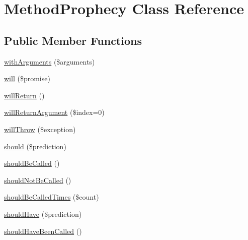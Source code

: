 \hypertarget{class_prophecy_1_1_prophecy_1_1_method_prophecy}{}\section{Method\+Prophecy Class Reference}
\label{class_prophecy_1_1_prophecy_1_1_method_prophecy}
\subsection*{Public Member Functions}
\begin{DoxyCompactItemize}
\item 
\mbox{\hyperlink{class_prophecy_1_1_prophecy_1_1_method_prophecy_a0e90c170a527e9527e3eb210d64e6bb3}{with\+Arguments}} (\$arguments)
\item 
\mbox{\hyperlink{class_prophecy_1_1_prophecy_1_1_method_prophecy_aa1cf9bd2272a7299be75a3b3741f07e1}{will}} (\$promise)
\item 
\mbox{\hyperlink{class_prophecy_1_1_prophecy_1_1_method_prophecy_aeacc5dc85f8c17f567e6f07baa1408ab}{will\+Return}} ()
\item 
\mbox{\hyperlink{class_prophecy_1_1_prophecy_1_1_method_prophecy_a0fbda70ce0045ba54f32db94bd7404f3}{will\+Return\+Argument}} (\$index=0)
\item 
\mbox{\hyperlink{class_prophecy_1_1_prophecy_1_1_method_prophecy_af54a02bf8e64c69934bdd3dbf188be32}{will\+Throw}} (\$exception)
\item 
\mbox{\hyperlink{class_prophecy_1_1_prophecy_1_1_method_prophecy_a61dec0f5a554b0c752d21194d7c677b9}{should}} (\$prediction)
\item 
\mbox{\hyperlink{class_prophecy_1_1_prophecy_1_1_method_prophecy_a89dcb101b383e29c2d527ac0f703b518}{should\+Be\+Called}} ()
\item 
\mbox{\hyperlink{class_prophecy_1_1_prophecy_1_1_method_prophecy_a3a7419a4f1949ab5dc20cd341420a529}{should\+Not\+Be\+Called}} ()
\item 
\mbox{\hyperlink{class_prophecy_1_1_prophecy_1_1_method_prophecy_abbb270e26c17d4d7f004d67b86323f06}{should\+Be\+Called\+Times}} (\$count)
\item 
\mbox{\hyperlink{class_prophecy_1_1_prophecy_1_1_method_prophecy_a31464ed717b407305a52c5bc42afb45b}{should\+Have}} (\$prediction)
\item 
\mbox{\hyperlink{class_prophecy_1_1_prophecy_1_1_method_prophecy_ae06b2879fb68c970cd5d213cae5b468d}{should\+Have\+Been\+Called}} ()
\item 

\end{DoxyCompactItemize}
